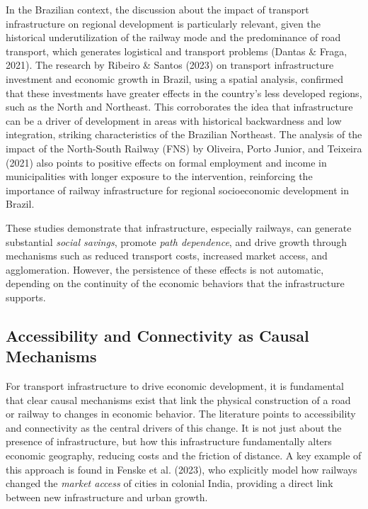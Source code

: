 \documentclass[12pt, a4paper]{article}
\begin{document}
In the Brazilian context, the discussion about the impact of transport infrastructure on regional development is particularly relevant, given the historical underutilization of the railway mode and the predominance of road transport, which generates logistical and transport problems (Dantas \& Fraga, 2021). The research by Ribeiro \& Santos (2023) on transport infrastructure investment and economic growth in Brazil, using a spatial analysis, confirmed that these investments have greater effects in the country's less developed regions, such as the North and Northeast. This corroborates the idea that infrastructure can be a driver of development in areas with historical backwardness and low integration, striking characteristics of the Brazilian Northeast. The analysis of the impact of the North-South Railway (FNS) by Oliveira, Porto Junior, and Teixeira (2021) also points to positive effects on formal employment and income in municipalities with longer exposure to the intervention, reinforcing the importance of railway infrastructure for regional socioeconomic development in Brazil.

These studies demonstrate that infrastructure, especially railways, can generate substantial \textit{social savings}, promote \textit{path dependence}, and drive growth through mechanisms such as reduced transport costs, increased market access, and agglomeration. However, the persistence of these effects is not automatic, depending on the continuity of the economic behaviors that the infrastructure supports.


\subsection{Accessibility and Connectivity as Causal Mechanisms}
For transport infrastructure to drive economic development, it is fundamental that clear causal mechanisms exist that link the physical construction of a road or railway to changes in economic behavior. The literature points to accessibility and connectivity as the central drivers of this change. It is not just about the presence of infrastructure, but how this infrastructure fundamentally alters economic geography, reducing costs and the friction of distance. A key example of this approach is found in Fenske et al. (2023), who explicitly model how railways changed the \textit{market access} of cities in colonial India, providing a direct link between new infrastructure and urban growth.
\end{document}

